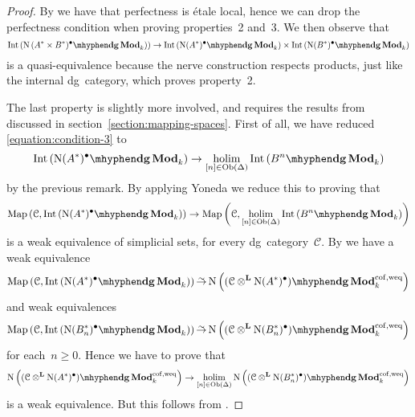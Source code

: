 \begin{refsection}
\begin{theorem}
\begin{proof}[Proof]
    By \cite[corollary 1.3.7.4]{hagII} we have that perfectness is \'etale local, hence we can drop the perfectness condition when proving properties~2 and~3. We then observe that
    \begin{equation}
      \Int\left( \dgMod{\nerve\left( A^*\times B^*)^\bullet}_k \right) \right)\to\Int\left( \dgMod{\nerve(A^*)^\bullet}_k \right)\times\Int\left( \dgMod{\nerve(B^*)^\bullet}_k \right)
    \end{equation}
    is a quasi-equivalence because the nerve construction respects products, just like the internal dg~category, which proves property~2.

    The last property is slightly more involved, and requires the results from \cite{toen} discussed in section~\ref{section:mapping-spaces}. First of all, we have reduced \eqref{equation:condition-3} to
    \begin{equation}
      \Int\left( \dgMod{\nerve(A^*)^\bullet}_k \right)\to\holim_{[n]\in\Ob(\Delta)}\Int\left( \dgMod{B^n}_k \right)
    \end{equation}
    by the previous remark. By applying Yoneda we reduce this to proving that
    \begin{equation}
      \Map\left( \mathcal{C},\Int\left( \dgMod{\nerve(A^*)^\bullet}_k \right) \right)\to\Map\left( \mathcal{C},\holim_{[n]\in\Ob(\Delta)}\Int\left( \dgMod{B^n}_k \right) \right)
    \end{equation}
    is a weak equivalence of simplicial sets, for every dg~category~$\mathcal{C}$. By \cite[theorem 4.2]{toen} we have a weak equivalence
    \begin{equation}
      \Map\left( \mathcal{C},\Int\left( \dgMod{\nerve(A^*)^\bullet}_k \right) \right)\weq\nerve\left( \dgMod{(\mathcal{C}\otimes^{\mathbf{L}}\nerve(A^*)^\bullet)}_k^{\mathrm{cof,weq}} \right)
    \end{equation}
    and weak equivalences
    \begin{equation}
      \Map\left( \mathcal{C},\Int\left( \dgMod{\nerve(B_n^*)^\bullet}_k \right) \right)\weq\nerve\left( \dgMod{(\mathcal{C}\otimes^{\mathbf{L}}\nerve(B_n^*)^\bullet)}_k^{\mathrm{cof,weq}} \right)
    \end{equation}
    for each~$n\geq 0$. Hence we have to prove that
    \begin{equation}
      \nerve\left( \dgMod{(\mathcal{C}\otimes^{\mathbf{L}}\nerve(A^*)^\bullet)}_k^{\mathrm{cof,weq}} \right)\to\holim_{[n]\in\Ob(\Delta)}\nerve\left( \dgMod{(\mathcal{C}\otimes^{\mathbf{L}}\nerve(B_n^*)^\bullet)}_k^{\mathrm{cof,weq}} \right)
    \end{equation}
    is a weak equivalence. But this follows from \cite[corollary B.0.8]{hagII}.
  \end{proof}
\end{theorem}


\end{refsection}
